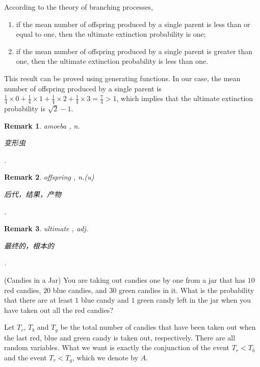 \documentclass[12pt,letterpaper, onecolumn]{exam}
\newtheorem{remark}{Remark}
\begin{document}
\begin{questions}
\begin{solution}
    \quad According to the theory of branching processes, 
    \begin{enumerate}
        \item if the mean number of offspring produced by a single parent is less than or equal to one, then the ultimate extinction probability is one;
        \item if the mean number of offspring produced by a single parent is greater than one, then the ultimate extinction probability is less than one.
    \end{enumerate}
    This result can be proved using generating functions. In our case, the mean number of offspring produced by a single parent is $\frac{1}{4}\times 0+\frac{1}{4}\times 1+\frac{1}{4}\times 2+\frac{1}{4}\times 3=\frac{7}{4}>1$, which implies that the ultimate extinction probability is $\sqrt{2}-1$.
\end{solution}
\begin{remark}
    amoeba , n. \begin{CJK}{UTF8}{gbsn}变形虫\end{CJK}.
\end{remark}
\begin{remark}
    offspring , n.(u) \begin{CJK}{UTF8}{gbsn}后代，结果，产物\end{CJK}.
\end{remark}
\begin{remark}
    ultimate , adj. \begin{CJK}{UTF8}{gbsn}最终的，根本的\end{CJK}.
\end{remark}

\question[](Candies in a Jar) You are taking out candies one by one from a jar that has $10$ red candies, $20$ blue candies, and $30$ green candies in it. What is the probability that there are at least $1$ blue candy and $1$ green candy left in the jar when you have taken out all the red candies?
\begin{solution}
    Let $T_r$, $T_b$ and $T_g$ be the total number of candies that have been taken out when the last red, blue and green candy is taken out, respectively. There are all random variables. What we want is exactly the conjunction of the event $T_r<T_b$ and the event $T_r<T_g$, which we denote by $A$.


\end{solution}
\end{questions}
\end{document}
